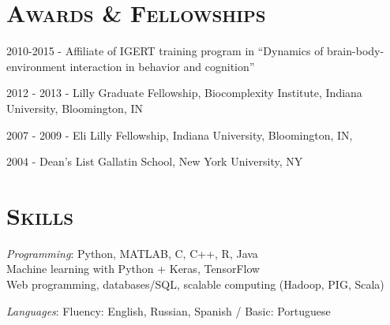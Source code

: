 \documentclass[margin,line,centered]{res}
\begin{document}
\begin{resume}
\section{\textsc{Awards \& Fellowships}}
2010-2015 - Affiliate of IGERT training program in ``Dynamics of brain-body-environment interaction in behavior and cognition'' 

2012 - 2013 - Lilly Graduate Fellowship, Biocomplexity Institute, Indiana University, Bloomington, IN

2007 - 2009 - Eli Lilly Fellowship, Indiana University, Bloomington, IN, 

2004 - Dean's List Gallatin School, New York University, NY


\section{\textsc{Skills}}



\hangindent=10pt \emph{Programming}: Python, MATLAB, C, C++, R, Java \\
Machine learning with Python + Keras, TensorFlow\\
Web programming, databases/SQL, scalable computing (Hadoop, PIG, Scala)

\emph{Languages}: Fluency: English, Russian, Spanish / Basic: Portuguese

\end{resume}
\end{document}
